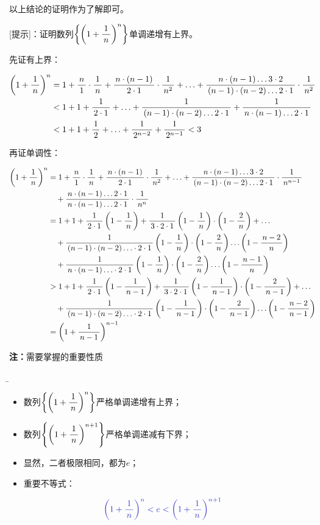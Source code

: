 \begin{shaded}

以上结论的证明作为了解即可。

[提示]：证明数列$\left\{\left(1+\df1n\right)^n\right\}$单调递增有上界。

先证有上界：

\begin{align}
	\left(1+\df1n\right)^n&=1+\df n1\cdot\df1n
	+\df{n\cdot(n-1)}{2\cdot1}\cdot\df1{n^2}+\ldots
	+\df{n\cdot(n-1)\ldots3\cdot2}{(n-1)\cdot(n-2)\ldots2\cdot1}\cdot\df1{n^2}\notag\\
	&<1+1+\df1{2\cdot1}+\ldots+\df1{(n-1)\cdot(n-2)\ldots2\cdot1}
	+\df1{n\cdot(n-1)\ldots2\cdot1}\notag\\
	&<1+1+\df12+\ldots+\df1{2^{n-2}}+\df1{2^{n-1}}<3\notag
\end{align}

再证单调性：

\begin{align}
	\left(1+\df1n\right)^n&=1+\df n1\cdot\df1n
	+\df{n\cdot(n-1)}{2\cdot1}\cdot\df1{n^2}+\ldots
	+\df{n\cdot(n-1)\ldots3\cdot2}{(n-1)\cdot(n-2)\ldots2\cdot1}
	\cdot\df1{n^{n-1}}\notag\\
	&\quad +\df{n\cdot(n-1)\ldots2\cdot1}{n\cdot(n-1)\ldots2\cdot1}
	\cdot\df1{n^{n}}\notag\\
	&=1+1+\df1{2\cdot 1}\left(1-\df1n\right)+\df1{3\cdot2\cdot
	1}\left(1-\df1n\right)\cdot\left(1-\df2n\right)+\ldots\notag\\
	&\quad +\df1{(n-1)\cdot(n-2)\ldots\cdot2\cdot
	1}\left(1-\df1n\right)\cdot\left(1-\df2n\right)
	\ldots\left(1-\df{n-2}n\right)\notag\\
	&\quad +\df1{n\cdot (n-1)\ldots\cdot2\cdot
	1}\left(1-\df1n\right)\cdot\left(1-\df2n\right)
	\ldots\left(1-\df{n-1}n\right)\notag\\
	&>1+1+\df1{2\cdot 1}\left(1-\df1{n-1}\right)+\df1{3\cdot2\cdot
	1}\left(1-\df1{n-1}\right)\cdot\left(1-\df2{n-1}\right)+\ldots\notag\\
	&\quad +\df1{(n-1)\cdot(n-2)\ldots\cdot2\cdot
	1}\left(1-\df1{n-1}\right)\cdot\left(1-\df2{n-1}\right)
	\ldots\left(1-\df{n-2}{n-1}\right)\notag\\
	&=\left(1+\df1{n-1}\right)^{n-1}\notag
\end{align}

\end{shaded}

{\bf 注：}需要掌握的重要性质{\b
\begin{itemize}
  \setlength{\itemindent}{1cm}
  \item 数列$\left\{\left(1+\df 1n\right)^n\right\}$严格单调递增有上界；
  \item 数列$\left\{\left(1+\df 1n\right)^{n+1}\right\}$严格单调递减有下界；
  \item 显然，二者极限相同，都为$e$；
  \item 重要不等式：
\end{itemize}}
$$\b\left(1+\df1n\right)^n<e<\left(1+\df1n\right)^{n+1}$$

